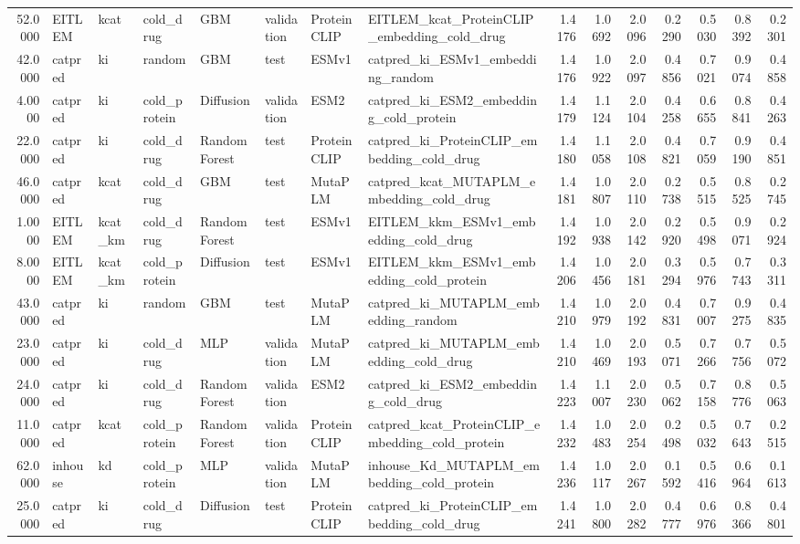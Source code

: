 \begin{tabular}{rlllllllrrrrrrr}
52.0000 & EITLEM & kcat & cold_drug & GBM & validation & ProteinCLIP & EITLEM_kcat_ProteinCLIP_embedding_cold_drug & 1.4176 & 1.0692 & 2.0096 & 0.2290 & 0.5030 & 0.8392 & 0.2301 \\
42.0000 & catpred & ki & random & GBM & test & ESMv1 & catpred_ki_ESMv1_embedding_random & 1.4176 & 1.0922 & 2.0097 & 0.4856 & 0.7021 & 0.9074 & 0.4858 \\
4.0000 & catpred & ki & cold_protein & Diffusion & validation & ESM2 & catpred_ki_ESM2_embedding_cold_protein & 1.4179 & 1.1124 & 2.0104 & 0.4258 & 0.6655 & 0.8841 & 0.4263 \\
22.0000 & catpred & ki & cold_drug & Random Forest & test & ProteinCLIP & catpred_ki_ProteinCLIP_embedding_cold_drug & 1.4180 & 1.1058 & 2.0108 & 0.4821 & 0.7059 & 0.9190 & 0.4851 \\
46.0000 & catpred & kcat & cold_drug & GBM & test & MutaPLM & catpred_kcat_MUTAPLM_embedding_cold_drug & 1.4181 & 1.0807 & 2.0110 & 0.2738 & 0.5515 & 0.8525 & 0.2745 \\
1.0000 & EITLEM & kcat_km & cold_drug & Random Forest & test & ESMv1 & EITLEM_kkm_ESMv1_embedding_cold_drug & 1.4192 & 1.0938 & 2.0142 & 0.2920 & 0.5498 & 0.9071 & 0.2924 \\
8.0000 & EITLEM & kcat_km & cold_protein & Diffusion & test & ESMv1 & EITLEM_kkm_ESMv1_embedding_cold_protein & 1.4206 & 1.0456 & 2.0181 & 0.3294 & 0.5976 & 0.7743 & 0.3311 \\
43.0000 & catpred & ki & random & GBM & test & MutaPLM & catpred_ki_MUTAPLM_embedding_random & 1.4210 & 1.0979 & 2.0192 & 0.4831 & 0.7007 & 0.9275 & 0.4835 \\
23.0000 & catpred & ki & cold_drug & MLP & validation & MutaPLM & catpred_ki_MUTAPLM_embedding_cold_drug & 1.4210 & 1.0469 & 2.0193 & 0.5071 & 0.7266 & 0.7756 & 0.5072 \\
24.0000 & catpred & ki & cold_drug & Random Forest & validation & ESM2 & catpred_ki_ESM2_embedding_cold_drug & 1.4223 & 1.1007 & 2.0230 & 0.5062 & 0.7158 & 0.8776 & 0.5063 \\
11.0000 & catpred & kcat & cold_protein & Random Forest & validation & ProteinCLIP & catpred_kcat_ProteinCLIP_embedding_cold_protein & 1.4232 & 1.0483 & 2.0254 & 0.2498 & 0.5032 & 0.7643 & 0.2515 \\
62.0000 & inhouse & kd & cold_protein & MLP & validation & MutaPLM & inhouse_Kd_MUTAPLM_embedding_cold_protein & 1.4236 & 1.0117 & 2.0267 & 0.1592 & 0.5416 & 0.6964 & 0.1613 \\
25.0000 & catpred & ki & cold_drug & Diffusion & test & ProteinCLIP & catpred_ki_ProteinCLIP_embedding_cold_drug & 1.4241 & 1.0800 & 2.0282 & 0.4777 & 0.6976 & 0.8366 & 0.4801 \\

\end{tabular}
